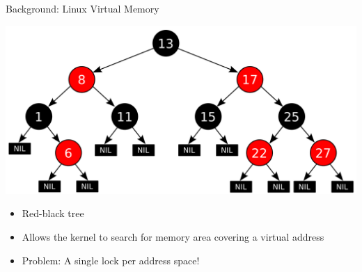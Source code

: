 \documentclass[aspectratio=169]{beamer}
\newcommand{\bi}{\begin{itemize}}
\newcommand{\ei}{\end{itemize}}
\begin{document}

\begin{frame}{Background: Linux Virtual Memory}
  \begin{center}
    \includegraphics[scale=0.2]{./figures/Red-black_tree.png}
  \end{center}
    \bi
    \item Red-black tree
    \item Allows the kernel to search for memory area covering a virtual address
      \pause
    \item {\color{red}Problem: A single lock per address space!}
    \ei
\end{frame}

\end{document}
